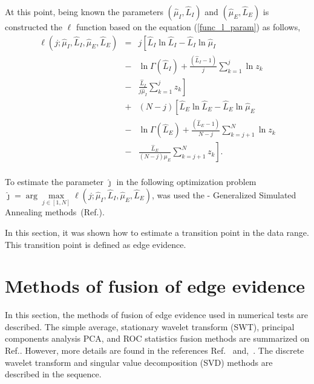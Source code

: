 \documentclass[conference]{IEEEtran}
\begin{document}
At this point, being known the parameters $(\widehat{\mu}_I, \widehat{L}_I)$ and $(\widehat{\mu}_E, \widehat{L}_E)$ is constructed the $\ell$ function based on the equation (\ref{func_l_param}) as follows,
\begin{equation}\label{l_com_paremetros}
 \begin{array}{lll}
\ell(j;\widehat{\mu}_I, \widehat{L}_I,\widehat{\mu}_E, \widehat{L}_E)&=&j\left[  \widehat{L}_I\ln \widehat{L}_I -\widehat{L}_I \ln \widehat{\mu}_I \right.\\
                                                      &-& \ln \Gamma(\widehat{L}_I) + \frac{(\widehat{L}_I  - 1)}{j} \sum_{k=1}^{j}  \ln z_k  \\
                                                      &-&\left.\frac{\widehat{L}_I}{j\widehat{\mu}_I} \sum_{k=1}^{j}   z_k\right] \\
                                               &+&(N-j)\left[\widehat{L}_E\ln \widehat{L}_E -\widehat{L}_E \ln \widehat{\mu}_E\right.\\
                                               &-&\ln \Gamma(\widehat{L}_E) + \frac{(\widehat{L}_E - 1)}{N-j} \sum_{k=j+1}^{N}\ln z_k\\
                                               &-&\left.\frac{\widehat{L}_E}{(N-j)\mu_E} \sum_{k=j+1}^{N}z_k\right]. \\
 \end{array}
 \end{equation}

To estimate the parameter $\widehat{\jmath}$ in the following optimization problem $\widehat{\jmath}= \arg\max\limits_{j\in [1,N]}\ell(j;\widehat{\mu}_I, \widehat{L}_I,\widehat{\mu}_E, \widehat{L}_E)$, was used the  - Generalized Simulated Annealing methods~(Ref.\cite{xgsh}).

In this section, it was shown how to estimate a transition point in the data range. This transition point is defined as edge evidence. 

\section{Methods of fusion of edge evidence}\label{sec_07}

In this section, the methods of fusion of edge evidence used in numerical tests are described. The simple average, stationary wavelet transform (SWT), principal components analysis PCA, and ROC statistics fusion methods are summarized on Ref.\cite{bmf_2019}. However, more details are found in the references Ref.~\cite{n_r,mit,gs} and,~\cite{fawcett}. The discrete wavelet transform and singular value decomposition (SVD) methods are described in the sequence.
\end{document}

